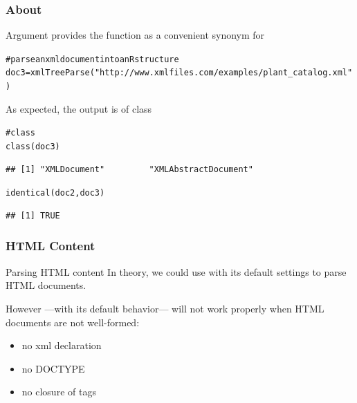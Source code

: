 \documentclass{beamer}\usepackage[]{graphicx}\usepackage[]{color}
\makeatletter
\newcommand{\hlstr}[1]{\textcolor[rgb]{0.063,0.58,0.627}{#1}}%
\newcommand{\hlcom}[1]{\textcolor[rgb]{0.588,0.588,0.588}{#1}}%
\newcommand{\hlstd}[1]{\textcolor[rgb]{0.196,0.196,0.196}{#1}}%
\newcommand{\hlkwb}[1]{\textcolor[rgb]{0.627,0,0.314}{#1}}%
\newcommand{\hlkwd}[1]{\textcolor[rgb]{0.78,0.227,0.412}{#1}}%
\newenvironment{kframe}{%
 \def\at@end@of@kframe{}%
 \ifinner\ifhmode%
  \def\at@end@of@kframe{\end{minipage}}%
  \begin{minipage}{\columnwidth}%
 \fi\fi%
 \def\FrameCommand##1{\hskip\@totalleftmargin \hskip-\fboxsep
 \colorbox{shadecolor}{##1}\hskip-\fboxsep
     \hskip-\linewidth \hskip-\@totalleftmargin \hskip\columnwidth}%
 \MakeFramed {\advance\hsize-\width
   \@totalleftmargin\z@ \linewidth\hsize
   \@setminipage}}%
 {\par\unskip\endMakeFramed%
 \at@end@of@kframe}
\newenvironment{knitrout}{}{} %
\makeatother
\begin{document}
\begin{frame}[fragile]
\frametitle{About }

\begin{block}{Argument }
 provides the function  as a convenient synonym for 

\begin{knitrout}\tiny
{}\color{fgcolor}\begin{kframe}
\begin{alltt}
\hlcom{# parse an xml document into an R structure}
\hlstd{doc3} \hlkwb{=} \hlkwd{xmlTreeParse}\hlstd{(}\hlstr{"http://www.xmlfiles.com/examples/plant_catalog.xml"}\hlstd{)}
\end{alltt}
\end{kframe}
\end{knitrout}

As expected, the output is of class 

\begin{knitrout}\tiny
{}\color{fgcolor}\begin{kframe}
\begin{alltt}
\hlcom{# class }
\hlkwd{class}\hlstd{(doc3)}
\end{alltt}
\begin{verbatim}
## [1] "XMLDocument"         "XMLAbstractDocument"
\end{verbatim}
\begin{alltt}
\hlkwd{identical}\hlstd{(doc2, doc3)}
\end{alltt}
\begin{verbatim}
## [1] TRUE
\end{verbatim}
\end{kframe}
\end{knitrout}

\end{block}

\end{frame}


\begin{frame}[fragile]
\frametitle{HTML Content}

\begin{block}{Parsing HTML content}
In theory, we could use  with its default settings to parse HTML documents. 

\bigskip
However  ---with its default behavior--- will not work properly when HTML documents are not well-formed:
\begin{itemize}
 \item no xml declaration
 \item no DOCTYPE
 \item no closure of tags
\end{itemize}
\end{block}

\end{frame}
\end{document}
